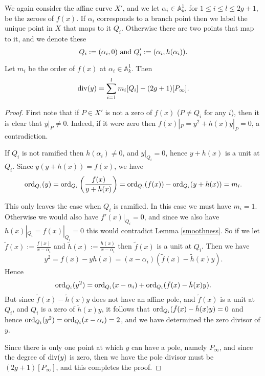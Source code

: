 We again consider the affine curve $X'$, and we let $\alpha_i \in \mathbb A_k^1$, for $1\leq i\leq l \leq 2g+1$, be the zeroes of $f(x)$.
If $\alpha_i$ corresponds to a branch point then we label the unique point in $X$ that maps to it $Q_i$.
Otherwise there are two points that map to it, and we denote these \[ Q_i:=(\alpha_i,0)\ {\rm and}\ Q_i':=(\alpha_i,h(\alpha_i)).\]


    \begin{lem}\label{ychar2}
    Let $m_i$ be the order of $f(x)$ at $\alpha_i\in \mathbb A_k^1$.
    Then 
        \[
        \operatorname{div}(y) = \sum_{i=1}^l m_i[Q_i] - (2g+1)[P_\infty].
        \]
    \end{lem}
    \begin{proof}
    First note that if $P\in X'$ is not a zero of $f(x)$ (\ie $P\neq Q_i$ for any $i$), then it is clear that $y|_P \neq 0$.
    Indeed, if it were zero then $f(x)|_P = y^2 + h(x)y|_P = 0$, a contradiction.
    
    If $Q_i$ is not ramified then $h(\alpha_i) \neq 0$, and $y|_{Q_i} = 0$, hence $y+h(x)$ is a unit at $Q_i$.
    Since $y(y+h(x)) = f(x)$, we have
        \[
        \operatorname{ord}_{Q_i}(y) = \operatorname{ord}_{Q_i}\left(\frac{f(x)}{y+h(x)}\right) = \operatorname{ord}_{Q_i}(f(x)) -\operatorname{ord}_{Q_i}(y+h(x)) = m_i.
        \]
    
    This only leaves the case when $Q_i$ is ramified. 
    In this case we must have $m_i=1$.
    Otherwise we would also have $f'(x)|_{Q_i} = 0$, and since we also have $h(x)|_{Q_i} = f(x)|_{Q_i} = 0$ this would contradict Lemma \ref{smoothness}.
    So if we let $\tilde f(x) := \frac{f(x)}{x-\alpha_i}$ and $\tilde h(x) := \frac{h(x)}{x-\alpha_i}$ then $\tilde f(x)$ is a unit at $Q_i$.
    Then we have \[y^2 = f(x) - yh(x) = (x-\alpha_i)(\tilde f(x) - \tilde h(x)y).\]
    Hence
        \[
        \operatorname{ord}_{Q_i}(y^2) = \operatorname{ord}_{Q_i}(x-\alpha_i) + \operatorname{ord}_{Q_i}(\tilde f(x) - \tilde h(x)y).
        \]
    But since $\tilde f(x) - \tilde h(x) y$ does not have an affine pole, and $\tilde f(x)$ is a unit at $Q_i$, and $Q_i$ is a zero of $\tilde h(x) y$, it follows that $\operatorname{ord}_{Q_i}(\tilde f(x) -  \tilde h(x) y) = 0$
    and hence $\operatorname{ord}_{Q_i}(y^2) = \operatorname{ord}_{Q_i}(x-\alpha_i) = 2$, and we have determined the zero divisor of $y$.
    
    Since there is only one point at which $y$ can have a pole, namely $P_\infty$, and since the degree of $\operatorname{div} (y)$ is zero, then we have the pole divisor must be $(2g+1)[P_\infty]$, and this completes the proof.
    \end{proof}



